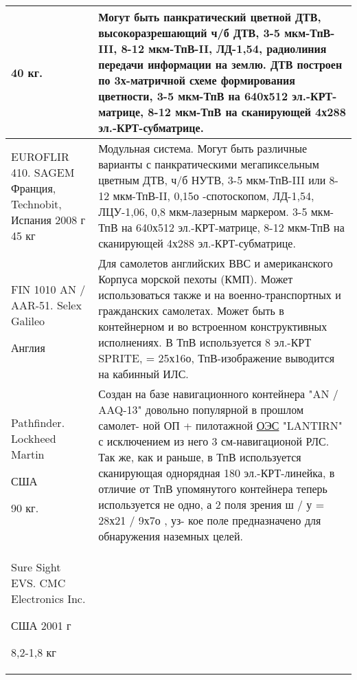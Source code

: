 \begin{landscape}
\begin{longtable}{| p{6cm} | p{18cm} |}
		40 кг. 
		 
& 
Могут быть панкратический цветной ДТВ, высокоразрешающий ч/б ДТВ, 3-5 мкм-ТпВ-III, 8-12 мкм-ТпВ-II, ЛД-1,54, радиолиния передачи информации на землю. 
ДТВ построен по 3х-матричной схеме формирования цветности, 3-5 мкм-ТпВ на 640х512 эл.-КРТ-матрице, 8-12 мкм-ТпВ на сканирующей 4х288 эл.-КРТ-субматрице. 
 
\\ \hline
		EUROFLIR 410. SAGEM
		\cite[]{EUROFLIR}
		Франция, Technobit, Испания	2008 г	45 кг
		 
& 
Модульная система. Могут быть различные варианты с панкратическими мегапиксельным цветным 
ДТВ, ч/б НУТВ, 3-5 мкм-ТпВ-III или 8-12 мкм-ТпВ-II, 0,15о
-спотоскопом, ЛД-1,54, ЛЦУ-1,06, 0,8 мкм-лазерным маркером. 3-5 мкм-ТпВ на 640х512 эл.-КРТ-матрице, 8-12 мкм-ТпВ на сканирующей 4х288 эл.-КРТ-субматрице.
 
\\ \hline
		FIN 1010 AN / AAR-51. Selex Galileo	
		
		Англия		 
& 
Для самолетов английских ВВС и американского Корпуса морской пехоты (КМП). Может использоваться также и на военно-транспортных и гражданских самолетах. Может быть в контейнерном и во встроенном конструктивных исполнениях. 
В ТпВ используется 8 эл.-КРТ SPRITE, = 25х16о, ТпВ-изображение выводится на кабинный ИЛС. 
 
\\ \hline
		Pathfinder. Lockheed Martin	
		
		США		
		
		90 кг. 
& 
Создан на базе навигационного контейнера "AN / AAQ-13" довольно популярной в прошлом самолет-
ной ОП + пилотажной  \hyperref[acroEOS]{ОЭС} "LANTIRN" с исключением из него 3 см-навигационой РЛС. 
Так же, как и раньше, в ТпВ используется сканирующая однорядная 180 эл.-КРТ-линейка, в отличие 
от ТпВ упомянутого контейнера теперь используется не одно, а 2 поля зрения ш / у = 28х21 / 9х7о
, уз-
кое поле предназначено для обнаружения наземных целей. 
\\ \hline
		Sure Sight EVS. CMC Electronics Inc.	
		
		США	2001 г	
		
		8,2-1,8 кг
		 

\end{longtable}
\end{landscape}

